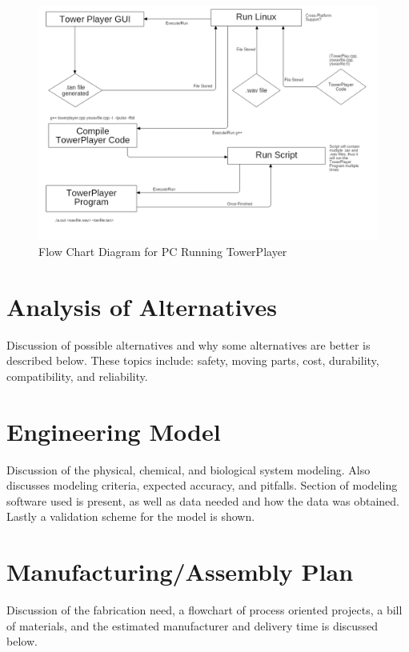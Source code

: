 \documentclass[12pt]{article}
\begin{document}
		\begin{figure}[ht!]
			\centering
			\includegraphics[width=170mm]{assets/PCRunningTowerPlayerFlowChartDiagram.png}
			\caption{Flow Chart Diagram for PC Running TowerPlayer \label{overflow}}
		\end{figure}

	\clearpage

\section{Analysis of Alternatives}
	Discussion of possible alternatives and why some alternatives are better is described below. These topics include: safety, moving parts, cost, durability, compatibility, and reliability.

	\newpage

\section{Engineering Model}
	Discussion of the physical, chemical, and biological system modeling. Also discusses modeling criteria, expected accuracy, and pitfalls. Section of modeling software used is present, as well as data needed and how the data was obtained. Lastly a validation scheme for the model is shown.

	\newpage

\section{Manufacturing/Assembly Plan}
	Discussion of the fabrication need, a flowchart of process oriented projects, a bill of materials, and the estimated manufacturer and delivery time is discussed below.
\end{document}
